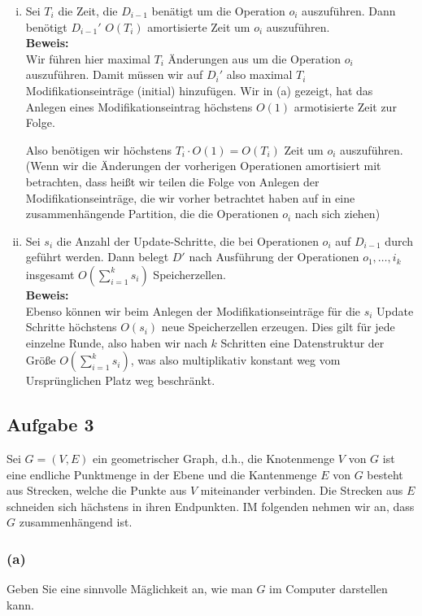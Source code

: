 \documentclass[11pt,a4paper,ngerman]{article}
\begin{document}
\begin{enumerate}[(i)]
   \item Sei $T_i$ die Zeit, die $D_{i-1}$ benätigt um die Operation $o_i$ auszuführen. Dann benötigt $D_{i-1}'$ $O(T_i)$ amortisierte Zeit um $o_i$ auszuführen.\\

   \noindent\textbf{Beweis:}\\
      Wir führen hier maximal $T_i$ Änderungen aus um die Operation $o_i$ auszuführen. Damit müssen wir auf $D_i'$ also maximal $T_i$ Modifikationseinträge (initial) hinzufügen. Wir in (a) gezeigt, hat das Anlegen eines Modifikationseintrag höchstens $O(1)$ armotisierte Zeit
	zur Folge.

	Also benötigen wir höchstens $T_i \cdot O(1) = O(T_i)$ Zeit um $o_i$ auszuführen. (Wenn wir die Änderungen der vorherigen Operationen
	amortisiert mit betrachten, dass heißt wir teilen die Folge von Anlegen der Modifikationseinträge, die wir vorher betrachtet haben
	auf in eine zusammenhängende Partition, die die Operationen $o_i$ nach sich ziehen)

   \item Sei $s_i$ die Anzahl der Update-Schritte, die bei Operationen $o_i$ auf $D_{i-1}$ durch geführt werden. Dann belegt $D'$ nach Ausführung der Operationen $o_1, \ldots, i_k$ insgesamt $O(\sum_{i=1}^k s_i)$ Speicherzellen.\\
   \noindent\textbf{Beweis:}\\
      
	Ebenso können wir beim Anlegen der Modifikationseinträge für die $s_i$ Update Schritte höchstens $O(s_i)$ neue Speicherzellen erzeugen.
	Dies gilt für jede einzelne Runde, also haben wir nach $k$ Schritten eine Datenstruktur der Größe
	$O(\sum_{i=1}^k s_i)$, was also multiplikativ konstant weg vom Ursprünglichen Platz weg beschränkt.
\end{enumerate}


\subsection*{Aufgabe 3}
   Sei $G = (V,E)$ ein geometrischer Graph, d.h., die Knotenmenge $V$ von $G$ ist eine endliche Punktmenge in der Ebene und die Kantenmenge $E$ von $G$ besteht aus Strecken, welche die Punkte aus $V$ miteinander verbinden. Die Strecken aus $E$ schneiden sich hächstens in ihren Endpunkten. IM folgenden nehmen wir an, dass $G$ zusammenhängend ist.

\subsubsection*{(a)}
Geben Sie eine sinnvolle Mäglichkeit an, wie man $G$ im Computer darstellen kann.\\
\end{document}
